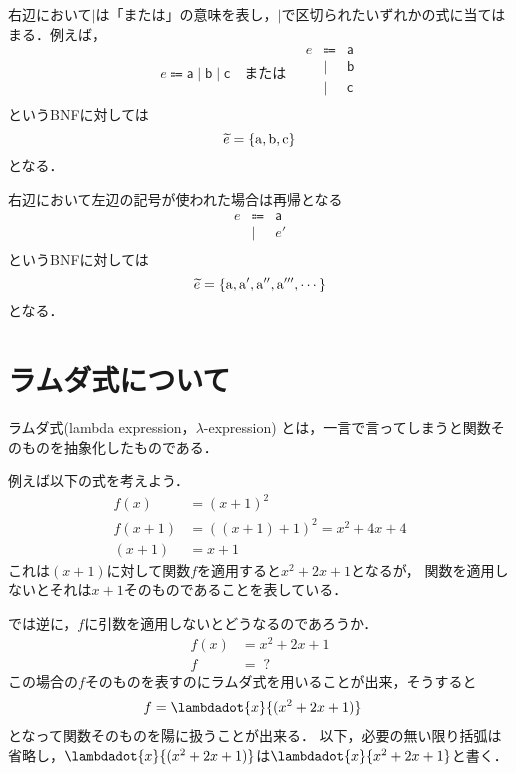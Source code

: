 \documentclass[a4paper,titlepage,report]{jsbook}
\begin{document}
右辺において$\mid$は「または」の意味を表し，$\mid$で区切られたいずれかの式に当てはまる．例えば，
\begin{equation}\label{eq:bnf-example-2} 
e\Coloneqq \mathsf{a} \mid \mathsf{b} \mid \mathsf{c}
\quad\text{または}\quad
\begin{array}{rcl}
    e    &\Coloneqq& \mathsf{a} \\
            &\mid&   \mathsf{b} \\
            &\mid&   \mathsf{c} \\
\end{array}
\end{equation}
というBNFに対しては
\begin{equation}
\widetilde{e} = \{\mathrm{a}, \mathrm{b}, \mathrm{c}\}
\end{equation}
となる．

右辺において左辺の記号が使われた場合は再帰となる
\begin{equation}\label{eq:bnf-example-3} 
\begin{array}{rcl}
    e    &\Coloneqq& \mathsf{a} \\
            &\mid&   e\mathsf{'} \\
\end{array}
\end{equation}
というBNFに対しては
\begin{equation}
\widetilde{e} = \{\mathrm{a}, \mathrm{a'}, \mathrm{a''}, \mathrm{a'''}, \cdots \}
\end{equation}
となる．

\section{ラムダ式について}\label{sc:about-lambda-expression}
ラムダ式(lambda expression，$\lambda$-expression) とは，一言で言ってしまうと関数そのものを抽象化したものである．

例えば以下の式を考えよう．
\begin{align}
f(x) &= (x + 1)^2\\
f(x + 1) &= {\left((x + 1) + 1\right)}^2 = x^2 + 4x + 4\\
(x + 1) &= x + 1
\end{align}
これは$(x + 1)$に対して関数$f$を適用すると$x^2 + 2x + 1$となるが，
関数を適用しないとそれは$x + 1$そのものであることを表している．

では逆に，$f$に引数を適用しないとどうなるのであろうか．
\begin{align}
f(x) &= x^2 + 2x + 1\\
f    &= \;?
\end{align}
この場合の$f$そのものを表すのにラムダ式を用いることが出来，そうすると
\begin{align}
f &= \lambdadot{x}{(x^2 + 2x + 1)}
\end{align}
となって関数そのものを陽に扱うことが出来る．
以下，必要の無い限り括弧は省略し，$\lambdadot{x}{(x^2 + 2x + 1)}$は$\lambdadot{x}{x^2 + 2x + 1}$と書く．
\end{document}
